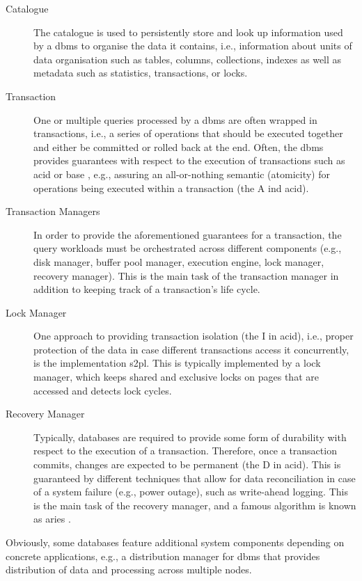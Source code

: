 \begin{description}
    \item[Catalogue] The catalogue is used to persistently store and look up information used by a \acrshort{dbms} to organise the data it contains, i.e., information about units of data organisation such as tables, columns, collections, indexes as well as metadata such as statistics, transactions, or locks.
    \item[Transaction] One or multiple queries processed by a \acrshort{dbms} are often wrapped in transactions, i.e., a series of operations that should be executed together and either be committed or rolled back at the end. Often, the \acrshort{dbms} provides guarantees with respect to the execution of transactions such as \acrshort{acid} \cite{Haerder:1983principles} or \acrshort{base} \cite{Pritchett:2008Base}, e.g., assuring an all-or-nothing semantic (atomicity) for operations being executed within a transaction (the A ind \acrshort{acid}).
    \item[Transaction Managers] In order to provide the aforementioned guarantees for a transaction, the query workloads must be orchestrated across different components (e.g., disk manager, buffer pool manager, execution engine, lock manager, recovery manager). This is the main task of the transaction manager in addition to keeping track of a transaction's life cycle.
    \item[Lock Manager] One approach to providing transaction isolation (the I in \acrshort{acid}), i.e., proper protection of the data in case different transactions access it concurrently, is the implementation \acrfull{s2pl}. This is typically implemented by a lock manager, which keeps shared and exclusive locks on pages that are accessed and detects lock cycles.
    \item[Recovery Manager] Typically, databases are required to provide some form of durability with respect to the execution of a transaction. Therefore, once a transaction commits, changes are expected to be permanent (the D in \acrshort{acid}). This is guaranteed by different techniques that allow for data reconciliation in case of a system failure (e.g., power outage), such as write-ahead logging. This is the main task of the recovery manager, and a famous algorithm is known as \acrshort{aries} \cite{Mohan:1992Aries}.
\end{description}

Obviously, some databases feature additional system components depending on concrete applications, e.g., a distribution manager for \acrshort{dbms} that provides distribution of data and processing across multiple nodes.